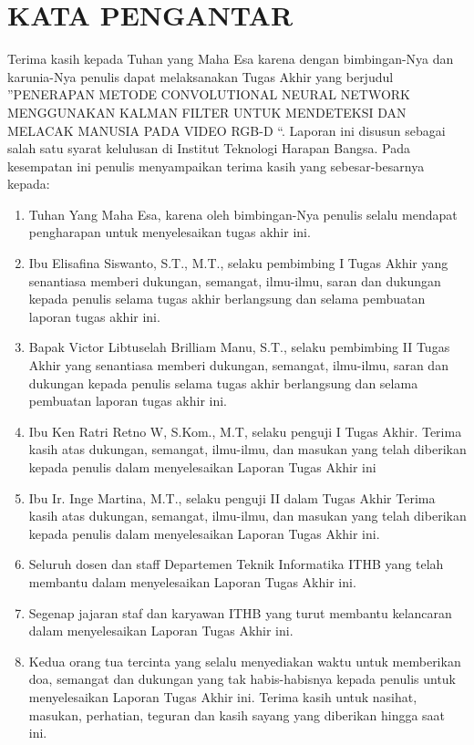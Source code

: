 \chapter*{KATA PENGANTAR}
{\raggedleft Terima kasih kepada Tuhan yang Maha Esa karena dengan bimbingan-Nya dan karunia-Nya penulis dapat melaksanakan Tugas Akhir yang berjudul \textquotedblright PENERAPAN METODE CONVOLUTIONAL NEURAL NETWORK MENGGUNAKAN KALMAN FILTER UNTUK MENDETEKSI DAN MELACAK MANUSIA PADA VIDEO RGB-D \textquotedblleft. Laporan ini disusun sebagai salah satu syarat kelulusan di Institut Teknologi Harapan Bangsa. Pada kesempatan ini penulis menyampaikan terima kasih yang sebesar-besarnya kepada:} \\
\begin{enumerate}
\item Tuhan Yang Maha Esa, karena oleh bimbingan-Nya penulis selalu mendapat pengharapan untuk menyelesaikan tugas akhir ini.
\item Ibu Elisafina Siswanto, S.T., M.T., selaku pembimbing I Tugas Akhir yang  senantiasa memberi dukungan, semangat, ilmu-ilmu, saran dan dukungan kepada penulis selama tugas akhir berlangsung dan selama pembuatan laporan tugas akhir ini.
\item Bapak Victor Libtuselah Brilliam Manu, S.T.,  selaku pembimbing II Tugas Akhir yang senantiasa memberi dukungan, semangat, ilmu-ilmu, saran dan dukungan kepada penulis selama tugas akhir berlangsung dan selama pembuatan laporan tugas akhir ini.
\item Ibu Ken Ratri Retno W, S.Kom., M.T, selaku penguji I Tugas Akhir. Terima kasih atas dukungan, semangat, ilmu-ilmu, dan masukan yang telah diberikan kepada penulis dalam menyelesaikan Laporan Tugas Akhir ini
\item Ibu Ir. Inge Martina, M.T., selaku penguji II dalam Tugas Akhir Terima kasih atas dukungan, semangat, ilmu-ilmu, dan masukan yang telah diberikan kepada penulis dalam menyelesaikan Laporan Tugas Akhir ini.
\item Seluruh dosen dan staff Departemen Teknik Informatika ITHB yang telah membantu dalam menyelesaikan Laporan Tugas Akhir ini.
\item Segenap jajaran staf dan karyawan ITHB yang turut membantu kelancaran dalam menyelesaikan Laporan Tugas Akhir ini.
\item Kedua orang tua tercinta yang selalu menyediakan waktu untuk memberikan doa, semangat dan dukungan yang tak habis-habisnya kepada penulis untuk menyelesaikan Laporan Tugas Akhir ini. Terima kasih untuk nasihat, masukan, perhatian, teguran dan kasih sayang yang diberikan hingga saat ini.
\\
\end{enumerate}
